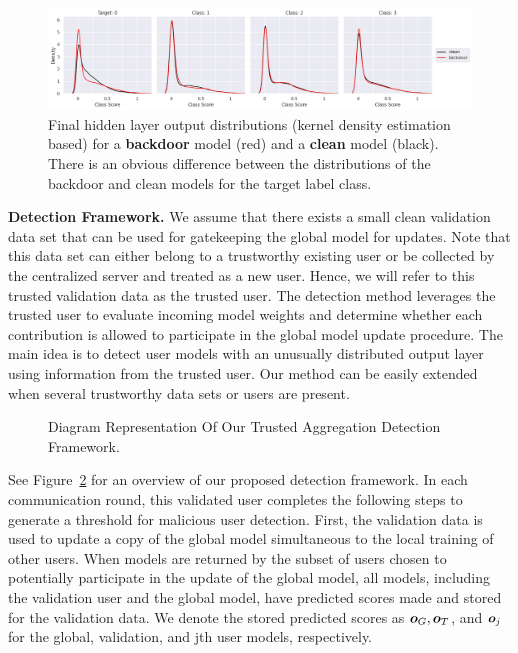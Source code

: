 \documentclass{article} %
\begin{document}
\begin{figure}[htp]
    \centering
    \includegraphics[width=\textwidth]{make_article/make_visuals/visuals/ext_motivation.png}
        \vspace{-10pt}
    \caption{\footnotesize Final hidden layer output distributions (kernel density estimation based) for a {\color{red}\bf backdoor} model (red) and a {\bf clean} model (black). There is an obvious difference between the distributions of the backdoor and clean models for the target label class.}
    \label{fig: motivation}
    \vspace{-5pt}
\end{figure}

\textbf{Detection Framework.} We assume that there exists a small clean validation data set that can be used for gatekeeping the global model for updates. Note that this data set can either belong to a trustworthy existing user or be collected by the centralized server and treated as a new user. Hence, we will refer to this trusted validation data as the trusted user. The detection method leverages the trusted user to evaluate incoming model weights and determine whether each contribution is allowed to participate in the global model update procedure. The main idea is to detect user models with an unusually distributed output layer using information from the trusted user. Our method can be easily extended when several trustworthy data sets or users are present.

\begin{figure}[htp]
\vspace{-5pt}
    \centering
    \vspace{-15pt}
    \caption{Diagram Representation Of Our Trusted Aggregation Detection Framework.}
    \label{fig: diagram}
\end{figure}


See Figure~\ref{fig: diagram} for an overview of our proposed detection framework. In each communication round, this validated user completes the following steps to generate a threshold for malicious user detection. First, the validation data is used to update a copy of the global model simultaneous to the local training of other users. When models are returned by the subset of users chosen to potentially participate in the update of the global model, all models, including the validation user and the global model, have predicted scores made and stored for the validation data. We denote the stored predicted scores as ${\bm{o}}_G, {\bm{o}}_T$, and ${\bm{o}}_j$ for the global, validation, and jth user models, respectively.
\end{document}
